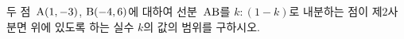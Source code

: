 두 점~$\mathrm{A}(1{,}\mkern3mu\mathopen{}-3)$, $\mathrm{B}(-4{,}\mkern3mu\mathopen{}6)$에 대하여 선분~$\mathrm{AB}$를 $k:(1-k)$로 내분하는 점이 제$2$사분면 위에 있도록 하는 실수 $k$의 값의 범위를 구하시오.
